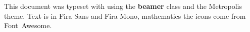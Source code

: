 \begin{frame}[plain]
  \begin{adjustwidth}{20mm}{20mm}
    \scriptsize \raggedright %
    This document was typeset with {\XeLaTeX} using the
    \textbf{beamer} class and the Metropolis theme. Text is in
    Fira Sans and Fira Mono, mathematics the icons come from Font~Awesome.
  \end{adjustwidth}
\end{frame}


